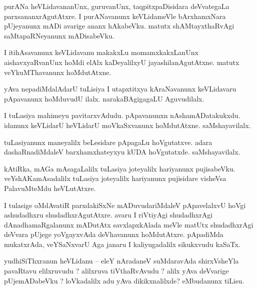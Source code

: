 \documentclass{article}
\begin{document}
\begin{mn}%
purANa heVLidavananUnx, guruvanUnx, taqpitxpaDisidara deVvategaLa parxsananxrAgutAtxre. I 
purANavanunx keVLidameVle bArxhamxNara pUjeyanunx mADi avarige ananx hAkabeVku. matutx 
shAMtayxthaRvAgi saMtapaRNeyanunx mADisabeVku.
\end{mn}

\begin{mn}%
I itihAsavanunx keVLidavanu makakxLu momamxkakxLanUnx aishavxyaRvanUnx hoMdi elAlx 
kaDeyalilxyU jayashilanAgutAtxne. matutx veYkuMThavanunx hoMdutAtxne.
\end{mn}

\begin{mn}%
yAva nepadiMdalAdarU tuLisiya I utapxtitxya kAraNavanunx keVLidavaru pApavanunx hoMduvudU 
ilalx. narakaBAgigagaLU Aguvudilalx.
\end{mn}

\begin{mn}%
I tuLasiya mahimeyu pavitarxvAdudu. pApavanunxn nAshamADatakukxdu. idanunx keVLidarU 
heVLidarU moVkaSxvanunx hoMdutAtxne. saMshayavilalx.
\end{mn}

\begin{mn}%
tuLasiyanunx maneyalilx beLesidare pApagaLu hoVgutatxve. adara dashaRnadiMdaleV 
barxhamxhateyxyu kUDA hoVgutatxde. saMshayavilalx.
\end{mn}

\begin{mn}%
kAtiRka, mAGa mAsagaLalilx tuLasiya joteyalilx hariyanunx pujisabeVku. veYshAKamAsadalilx 
tuLasiya joteyalilx hariyanunx pujisidare visheVsa PalavuMteMdu heVLutAtxre.
\end{mn}

\begin{mn}%
I tulasige oMdAvatiR parxdakiSxNe mADuvudariMdaleV pApavelalxvU hoVgi ashudadhxru 
shudadhxrAgutAtxre. avaru I riVtiyAgi shudadhxrAgi dAnadhamaRgalanunx mADutAtx 
savxlapxkAlada meVle matUtx shudadhxrAgi deVvara pUjege yoVgayxvAda deVhavanunx 
hoMdutAtxre. pApadiMda mukatxrAda, veYSaNxvarU Aga janaru I kaliyugadalilx sikukxvudu kaSaTx.
\end{mn}



\begin{mn}%
yudhiSiThxranun heVLidanu -- eleY nAradaneV suMdaravAda shirxVsheYla pavaRtavu elilxruvudu ? 
alilxruva tiVthaRvAvudu ? alilx yAva deVvarige pUjemADabeVku ? loVkadalilx adu yAva 
dikikxnalilxde? eMbudanunx tiLisu.
\end{mn}
\end{document}
